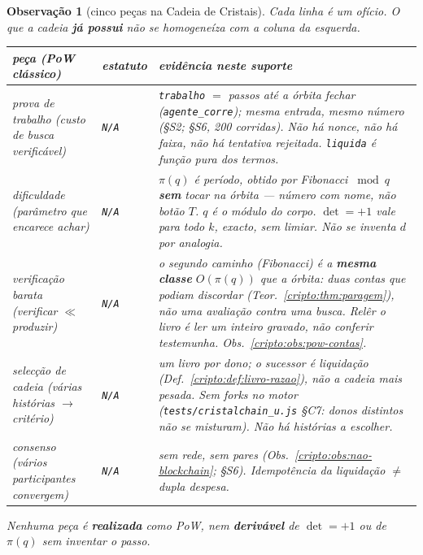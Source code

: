 \documentclass[11pt,a4paper]{article}
\newcommand{\code}[1]{\texttt{\small #1}}
\newtheorem{observacao}[teorema]{Observação}
\begin{document}
\begin{observacao}[cinco peças na Cadeia de Cristais]\label{cripto:obs:pow-pecas}
Cada linha é um ofício.
O que a cadeia \textbf{já possui} não se homogeneíza com a coluna da esquerda.

\begin{center}\small
\begin{tabular}{@{}p{}p{}p{}@{}}
\toprule
peça (PoW clássico) & estatuto & evidência neste suporte \\
\midrule
prova de trabalho
  (custo de busca verificável)
  & \texttt{N/A}
  & \texttt{trabalho} $=$ passos até a órbita fechar
    (\code{agente\_corre}); mesma entrada, mesmo número
    (§S2; §S6, 200 corridas).
    Não há nonce, não há faixa, não há tentativa rejeitada.
    \code{liquida} é função pura dos termos. \\
dificuldade
  (parâmetro que encarece achar)
  & \texttt{N/A}
  & $\pi(q)$ é período, obtido por Fibonacci $\bmod q$
    \textbf{sem} tocar na órbita --- número com nome, não botão $T$.
    $q$ é o módulo do corpo.
    $\det=+1$ vale para todo $k$, exacto, sem limiar.
    Não se inventa $d$ por analogia. \\
verificação barata
  (verificar $\ll$ produzir)
  & \texttt{N/A}
  & o segundo caminho (Fibonacci) é a \textbf{mesma classe}
    $O(\pi(q))$ que a órbita: duas contas que podiam discordar
    (Teor.~\ref{cripto:thm:paragem}), não uma avaliação contra
    uma busca.
    Relêr o livro é ler um inteiro gravado, não conferir testemunha.
    Obs.~\ref{cripto:obs:pow-contas}. \\
selecção de cadeia
  (várias histórias $\to$ critério)
  & \texttt{N/A}
  & um livro por dono; o sucessor é liquidação
    (Def.~\ref{cripto:def:livro-razao}), não a cadeia mais pesada.
    Sem forks no motor
    (\code{tests/cristalchain\_u.js} §C7: donos distintos não se misturam).
    Não há histórias a escolher. \\
consenso
  (vários participantes convergem)
  & \texttt{N/A}
  & sem rede, sem pares
    (Obs.~\ref{cripto:obs:nao-blockchain}; §S6).
    Idempotência da liquidação $\neq$ dupla despesa. \\
\bottomrule
\end{tabular}
\end{center}

Nenhuma peça é \textbf{realizada} como PoW, nem \textbf{derivável}
de $\det=+1$ ou de $\pi(q)$ sem inventar o passo.
\end{observacao}
\end{document}
